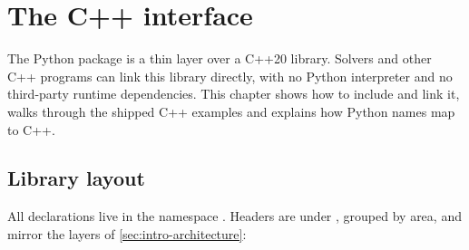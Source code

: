 \chapter{The C++ interface}\label{ch:cpp}

The Python package is a thin layer over a C++20 library. Solvers and other C++ programs can link
this library directly, with no Python interpreter and no third-party runtime dependencies. This
chapter shows how to include and link it, walks through the shipped C++ examples and explains
how Python names map to C++.

\section{Library layout}\label{sec:cpp-layout}

All declarations live in the namespace . Headers are under ,
grouped by area, and mirror the layers of \cref{sec:intro-architecture}:

